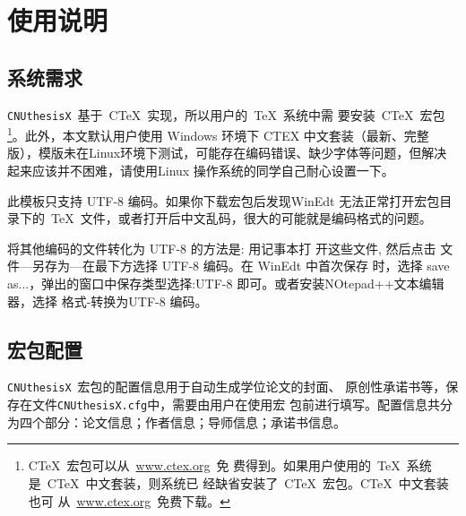 ﻿
\chapter{使用说明}

\section{系统需求}

\texttt{CNUthesisX}~基于~C\TeX~实现，所以用户的~\TeX~系统中需
要安装~C\TeX~宏包\footnote{C\TeX~宏包可以从~\url{www.ctex.org}~免
费得到。如果用户使用的~\TeX~系统是~C\TeX~中文套装，则系统已
经缺省安装了~C\TeX~宏包。C\TeX~中文套装也可
从~\url{www.ctex.org}~免费下载。}。此外，本文默认用户使用 Windows 环境下 CTEX 中文套装（最新、完整版），模版未在Linux环境下测试，可能存在编码错误、缺少字体等问题，但解决起来应该并不困难，请使用Linux 操作系统的同学自己耐心设置一下。

此模板只支持 UTF-8 编码。如果你下载宏包后发现WinEdt 无法正常打开宏包目录下的~\TeX~文件，或者打开后中文乱码，很大的可能就是编码格式的问题。

将其他编码的文件转化为 UTF-8 的方法是: 用记事本打
开这些文件, 然后点击 文件—另存为—在最下方选择 UTF-8 编码。在 WinEdt 中首次保存
时，选择 save as...，弹出的窗口中保存类型选择:UTF-8 即可。或者安装NOtepad++文本编辑器，选择 格式-转换为UTF-8 编码。



\section{宏包配置}
\label{section:cfg}

\texttt{CNUthesisX}~宏包的配置信息用于自动生成学位论文的封面、
原创性承诺书等，保存在文件\texttt{CNUthesisX.cfg}中，需要由用户在使用宏
包前进行填写。配置信息共分为四个部分：论文信息；作者信息；导师信息；承诺书信息。
